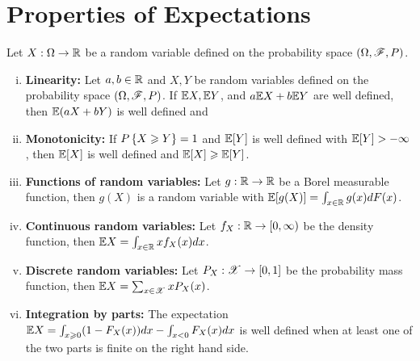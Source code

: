 \documentclass[letterpaper,10pt,english]{article}
\begin{document}
\section{Properties of Expectations}
\begin{thm}[Properties] 
Let $X: \Omega \to \mathbb{R}$ be a random variable defined on the probability space $(\Omega, \mathscr{F}, P)$. 
\begin{enumerate}[(i)]
\item \textbf{Linearity:} Let $a, b \in \mathbb{R}$ and $X, Y$ be random variables defined on the probability space $(\Omega, \mathscr{F}, P)$. 
If $\mathbb{E} X, \mathbb{E} Y$, and $a\mathbb{E} X + b\mathbb{E} Y$ are well defined, then $\mathbb{E}(aX+bY)$ is well defined and 
\item \textbf{Monotonicity:} If $P\left\{X \geqslant Y\right\} = 1$ and $\mathbb{E}[Y]$ is well defined
with $\mathbb{E}[Y] > -\infty$, then $\mathbb{E}[X]$ is well defined and $\mathbb{E}[X] \geqslant \mathbb{E}[Y]$. 
\item \textbf{Functions of random variables:} Let $g: \mathbb{R} \to \mathbb{R}$ be a Borel measurable function, then $g(X)$ is a random variable with $\mathbb{E}[g(X)] = \int_{x\in \mathbb{R}}g(x)dF(x)$. 
\item \textbf{Continuous random variables:} Let $f_X: \mathbb{R} \to [0, \infty)$ be the density function, 
then $\mathbb{E} X = \int_{x \in \mathbb{R}}xf_X(x)dx$. 
\item \textbf{Discrete random variables:} Let $P_X: \mathscr{X} \to [0,1]$ be the probability mass function, 
then $\mathbb{E} X = \sum_{x \in \mathscr{X}}xP_X(x)$. 
\item \textbf{Integration by parts:} The expectation $\mathbb{E} X = \int_{x \geqslant 0}(1-F_X(x))dx - \int_{x < 0}F_X(x)dx$ is well defined when at least one of the two parts is finite on the right hand side. 
\end{enumerate}
\end{thm}
\end{document}
